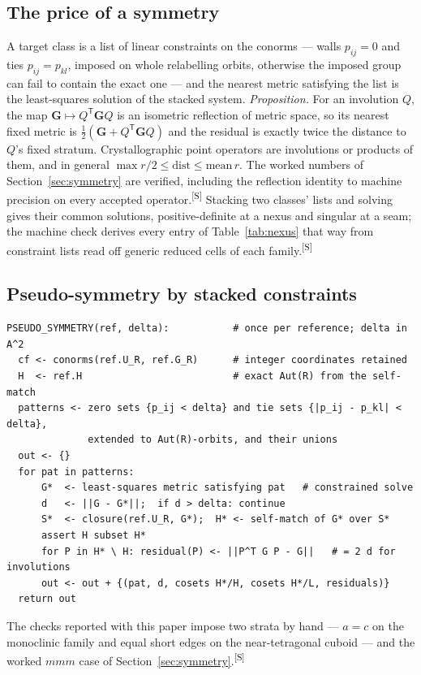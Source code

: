 \documentclass[preprint,pdf]{iucr}          %
\makeatletter
\newcommand{\Gmet}{\mathbf{G}}
\newcommand{\chk}[1]{\textsuperscript{[S\@nameuse{zn@#1}]}}
\makeatother
\begin{document}
\subsection{The price of a symmetry}
A target class is a list of linear constraints on the conorms --- walls $p_{ij}=0$ and ties $p_{ij}=p_{kl}$, imposed on whole relabelling orbits, otherwise the imposed group can fail to contain the exact one --- and the nearest metric satisfying the list is the least-squares solution of the stacked system. \emph{Proposition.} For an involution $Q$, the map $\Gmet\mapsto Q^{\mathsf T}\Gmet Q$ is an isometric reflection of metric space, so its nearest fixed metric is $\tfrac12(\Gmet+Q^{\mathsf T}\Gmet Q)$ and the residual is exactly twice the distance to $Q$'s fixed stratum. Crystallographic point operators are involutions or products of them, and in general $\max r/2\le\mathrm{dist}\le\mathrm{mean}\,r$. The worked numbers of Section~\ref{sec:symmetry} are verified, including the reflection identity to machine precision on every accepted operator.\chk{z:sym-profile} Stacking two classes' lists and solving gives their common solutions, positive-definite at a nexus and singular at a seam; the machine check derives every entry of Table~\ref{tab:nexus} that way from constraint lists read off generic reduced cells of each family.\chk{z:nexus}

\subsection{Pseudo-symmetry by stacked constraints}
\begin{small}\begin{verbatim}
PSEUDO_SYMMETRY(ref, delta):           # once per reference; delta in A^2
  cf <- conorms(ref.U_R, ref.G_R)      # integer coordinates retained
  H  <- ref.H                          # exact Aut(R) from the self-match
  patterns <- zero sets {p_ij < delta} and tie sets {|p_ij - p_kl| < delta},
              extended to Aut(R)-orbits, and their unions
  out <- {}
  for pat in patterns:
      G*  <- least-squares metric satisfying pat   # constrained solve
      d   <- ||G - G*||;  if d > delta: continue
      S*  <- closure(ref.U_R, G*);  H* <- self-match of G* over S*
      assert H subset H*
      for P in H* \ H: residual(P) <- ||P^T G P - G||   # = 2 d for involutions
      out <- out + {(pat, d, cosets H*/H, cosets H*/L, residuals)}
  return out
\end{verbatim}\end{small}
The checks reported with this paper impose two strata by hand --- $a=c$ on the monoclinic family and equal short edges on the near-tetragonal cuboid --- and the worked $mmm$ case of Section~\ref{sec:symmetry}.\chk{z:pseudo}
\end{document}
